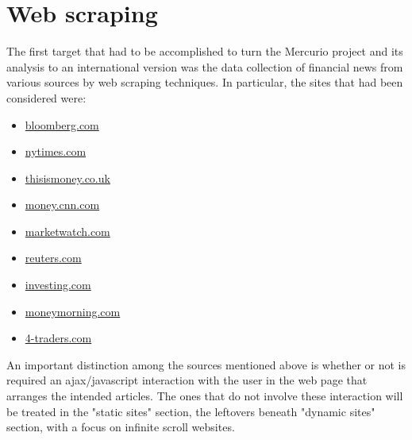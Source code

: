 \section{Web scraping}
The first target that had to be accomplished to turn the Mercurio project and its analysis to an international version was the data collection of financial news from various sources by web scraping techniques. In particular, the sites that had been considered were: 
\begin{itemize}
\item \href{https://www.bloomberg.com}{bloomberg.com}
\item \href{https://www.nytimes.com}{nytimes.com}
\item \href{https://www.thisismoney.co.uk}{thisismoney.co.uk}
\item \href{http://money.cnn.com}{money.cnn.com}
\item \href{http://www.marketwatch.com}{marketwatch.com}
\item \href{http://www.reuters.com}{reuters.com}
\item \href{http://www.investing.com}{investing.com}
\item \href{http://www.moneymorning.com}{moneymorning.com} 
\item \href{http://www.4-traders.com/}{4-traders.com}
\end{itemize}
An important distinction among the sources mentioned above is whether or not is required an ajax/javascript interaction with the user in the web page that arranges the intended articles. The ones that do  not involve these interaction will be treated in the "static sites" section, the leftovers beneath "dynamic sites" section, with a focus on infinite scroll websites. \\ 


%   



